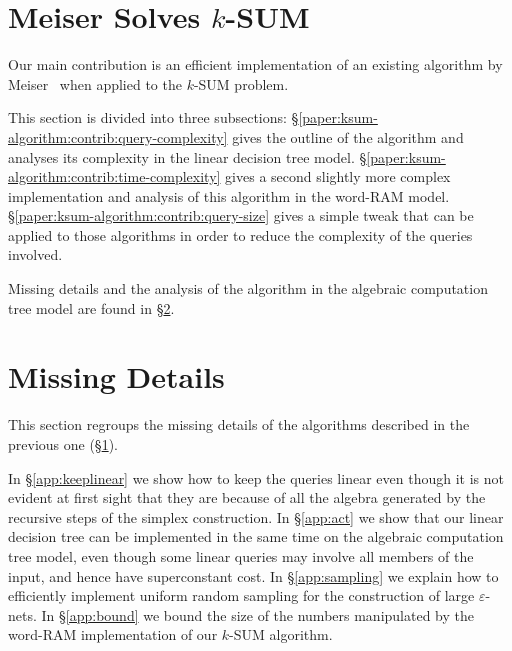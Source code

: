 \section{Meiser Solves \texorpdfstring{$k$-SUM}{k-SUM}}%
\label{paper:ksum-algorithm:proofs}

Our main contribution is an efficient implementation of an
existing algorithm by Meiser~\cite{M93} when applied to the \(k\)-SUM problem.

This section is divided into three subsections:
\S\ref{paper:ksum-algorithm:contrib:query-complexity} gives the outline of the
algorithm and analyses its complexity in the linear decision tree model.
\S\ref{paper:ksum-algorithm:contrib:time-complexity} gives a second
slightly more complex implementation and analysis of this algorithm in the word-RAM
model. \S\ref{paper:ksum-algorithm:contrib:query-size} gives a simple
tweak that can be applied to those algorithms in order to reduce the complexity
of the queries involved.

Missing details and the analysis of the algorithm in the algebraic computation
tree model are found in \S\ref{paper:ksum-algorithm:details}.





\section{Missing Details}\label{paper:ksum-algorithm:details}

This section regroups the missing details of the algorithms described in the
previous one (\S\ref{paper:ksum-algorithm:proofs}).

In \S\ref{app:keeplinear} we show how to keep the queries linear even though it
is not evident at first sight that they are because of all the algebra
generated by the recursive steps of the simplex construction.
%
In \S\ref{app:act} we show that our linear decision tree can be implemented in
the same time on the algebraic computation tree model, even though some linear
queries may involve all members of the input, and hence have superconstant
cost.
%
In \S\ref{app:sampling} we explain how to efficiently implement uniform random sampling
for the construction of large \(\varepsilon\)-nets.
%
In \S\ref{app:bound} we bound the size of the numbers manipulated by the
word-RAM implementation of our \(k\)-SUM algorithm.





